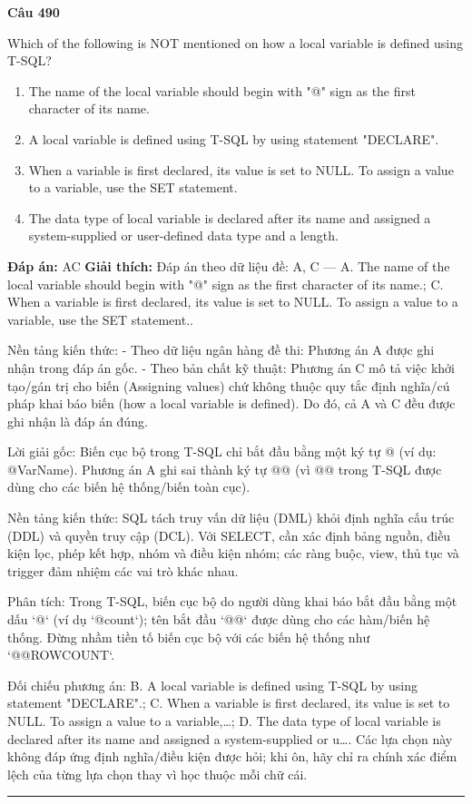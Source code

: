\documentclass[11pt,a4paper]{article}
\newenvironment{question}[1]{%
  \par\vspace{1em}\noindent\textbf{\large Câu #1}\par\vspace{0.4em}
}{%
  \par\vspace{1em}\hrule\vspace{0.6em}
}
\newenvironment{choices}{%
  \begin{enumerate}[label=\textbf{\Alph*.},leftmargin=2.2em,itemsep=2pt,topsep=3pt]
}{%
  \end{enumerate}
}
\newcommand{\choice}{\item}
\begin{document}
\begin{question}{490}
Which of the following is NOT mentioned on how a local variable is defined using T-SQL?
\begin{choices}
\choice The name of the local variable should begin with "@" sign as the first character of its name.
\choice A local variable is defined using T-SQL by using statement "DECLARE".
\choice When a variable is first declared, its value is set to NULL. To assign a value to a variable, use the SET statement.
\choice The data type of local variable is declared after its name and assigned a system-supplied or user-defined data type and a length.
\end{choices}
\textbf{Đáp án:} AC
\textbf{Giải thích:} Đáp án theo dữ liệu đề: A, C — A. The name of the local variable should begin with "@" sign as the first character of its name.; C. When a variable is first declared, its value is set to NULL. To assign a value to a variable, use the SET statement..

Nền tảng kiến thức:
- Theo dữ liệu ngân hàng đề thi: Phương án A được ghi nhận trong đáp án gốc.
- Theo bản chất kỹ thuật: Phương án C mô tả việc khởi tạo/gán trị cho biến (Assigning values) chứ không thuộc quy tắc định nghĩa/cú pháp khai báo biến (how a local variable is defined).
Do đó, cả A và C đều được ghi nhận là đáp án đúng.

Lời giải gốc: Biến cục bộ trong T-SQL chỉ bắt đầu bằng một ký tự @ (ví dụ: @VarName). Phương án A ghi sai thành ký tự @@ (vì @@ trong T-SQL được dùng cho các biến hệ thống/biến toàn cục).

Nền tảng kiến thức: SQL tách truy vấn dữ liệu (DML) khỏi định nghĩa cấu trúc (DDL) và quyền truy cập (DCL). Với SELECT, cần xác định bảng nguồn, điều kiện lọc, phép kết hợp, nhóm và điều kiện nhóm; các ràng buộc, view, thủ tục và trigger đảm nhiệm các vai trò khác nhau.

Phân tích: Trong T-SQL, biến cục bộ do người dùng khai báo bắt đầu bằng một dấu `@` (ví dụ `@count`); tên bắt đầu `@@` được dùng cho các hàm/biến hệ thống. Đừng nhầm tiền tố biến cục bộ với các biến hệ thống như `@@ROWCOUNT`.

Đối chiếu phương án: B. A local variable is defined using T-SQL by using statement "DECLARE".; C. When a variable is first declared, its value is set to NULL. To assign a value to a variable,…; D. The data type of local variable is declared after its name and assigned a system-supplied or u…. Các lựa chọn này không đáp ứng định nghĩa/điều kiện được hỏi; khi ôn, hãy chỉ ra chính xác điểm lệch của từng lựa chọn thay vì học thuộc mỗi chữ cái.
\end{question}
\end{document}
